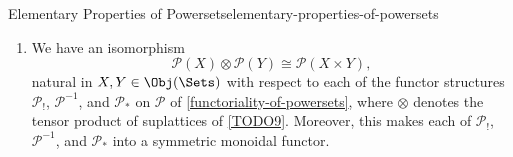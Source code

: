 \begin{proposition}{Elementary Properties of Powersets}{elementary-properties-of-powersets}
\begin{enumerate}
        \item\label{properties-of-powersets-as-categories-interaction-with-products-3}We have an isomorphism
            \[
                \mathcal{P}(X)\otimes\mathcal{P}(Y)%
                \cong
                \mathcal{P}(X\times Y),%
            \]%
            natural in $X,Y\in\Obj(\Sets)$ with respect to each of the functor structures $\mathcal{P}_{!}$, $\mathcal{P}^{-1}$, and $\mathcal{P}_{*}$ on $\mathcal{P}$ of \cref{functoriality-of-powersets}, where $\otimes$ denotes the tensor product of suplattices of \cref{TODO9}. Moreover, this makes each of $\mathcal{P}_{!}$, $\mathcal{P}^{-1}$, and $\mathcal{P}_{*}$ into a symmetric monoidal functor.
    \end{enumerate}
\end{proposition}
